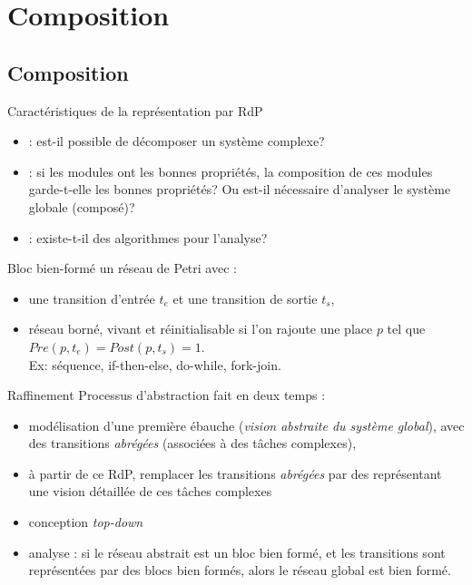 \documentclass[compress]{beamer}
\begin{document}
\section{Composition}\subsection{Composition}
\begin{frame}{Caractéristiques de la représentation par RdP}
\begin{itemize}
\item {} : est-il possible de décomposer un système complexe?
\item {} : si les modules ont les bonnes propriétés, la composition de ces modules garde-t-elle les bonnes propriétés? Ou est-il nécessaire d'analyser le système globale (composé)?
\item {} : existe-t-il des algorithmes pour l'analyse?
\end{itemize}
\begin{block}{Bloc bien-formé}
	un réseau de Petri avec :
	\begin{itemize}
	\item une transition d'entrée $t_e$ et une transition de sortie $t_s$,
	\item réseau borné, vivant et réinitialisable si l'on rajoute une place $p$ tel que $Pre(p,t_e)=Post(p,t_s)=1$. \\
	Ex: séquence, if-then-else, do-while, fork-join.
	\end{itemize}
\end{block}
\end{frame}

\begin{frame}{Raffinement}
Processus d'abstraction fait en deux temps :
\begin{itemize}
\item modélisation d'une  première ébauche ({\it vision abstraite du système global}), avec des transitions {\it abrégées} (associées à des tâches complexes),
\item à partir de ce RdP, remplacer les transitions {\it abrégées} par des  représentant une vision détaillée de ces tâches complexes
\item conception {\it top-down}
\item analyse : si le réseau abstrait est un bloc bien formé, et les transitions sont représentées par des blocs bien formés, alors le réseau global est bien formé.
\end{itemize} 
\end{frame}
\end{document}
